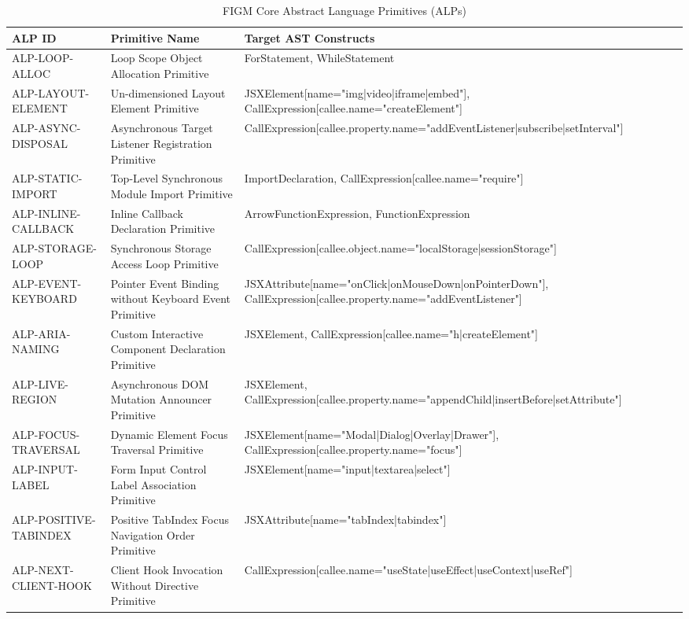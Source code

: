 \begin{table}[htbp]
\centering
\caption{FIGM Core Abstract Language Primitives (ALPs)}
\label{tab:figm_alps}
\begin{tabular}{lll}
\toprule
\textbf{ALP ID} & \textbf{Primitive Name} & \textbf{Target AST Constructs} \\
\midrule
ALP-LOOP-ALLOC & Loop Scope Object Allocation Primitive & ForStatement, WhileStatement \\
ALP-LAYOUT-ELEMENT & Un-dimensioned Layout Element Primitive & JSXElement[name="img|video|iframe|embed"], CallExpression[callee.name="createElement"] \\
ALP-ASYNC-DISPOSAL & Asynchronous Target Listener Registration Primitive & CallExpression[callee.property.name="addEventListener|subscribe|setInterval"] \\
ALP-STATIC-IMPORT & Top-Level Synchronous Module Import Primitive & ImportDeclaration, CallExpression[callee.name="require"] \\
ALP-INLINE-CALLBACK & Inline Callback Declaration Primitive & ArrowFunctionExpression, FunctionExpression \\
ALP-STORAGE-LOOP & Synchronous Storage Access Loop Primitive & CallExpression[callee.object.name="localStorage|sessionStorage"] \\
ALP-EVENT-KEYBOARD & Pointer Event Binding without Keyboard Event Primitive & JSXAttribute[name="onClick|onMouseDown|onPointerDown"], CallExpression[callee.property.name="addEventListener"] \\
ALP-ARIA-NAMING & Custom Interactive Component Declaration Primitive & JSXElement, CallExpression[callee.name="h|createElement"] \\
ALP-LIVE-REGION & Asynchronous DOM Mutation Announcer Primitive & JSXElement, CallExpression[callee.property.name="appendChild|insertBefore|setAttribute"] \\
ALP-FOCUS-TRAVERSAL & Dynamic Element Focus Traversal Primitive & JSXElement[name="Modal|Dialog|Overlay|Drawer"], CallExpression[callee.property.name="focus"] \\
ALP-INPUT-LABEL & Form Input Control Label Association Primitive & JSXElement[name="input|textarea|select"] \\
ALP-POSITIVE-TABINDEX & Positive TabIndex Focus Navigation Order Primitive & JSXAttribute[name="tabIndex|tabindex"] \\
ALP-NEXT-CLIENT-HOOK & Client Hook Invocation Without Directive Primitive & CallExpression[callee.name="useState|useEffect|useContext|useRef"] \\

\end{tabular}
\end{table}
